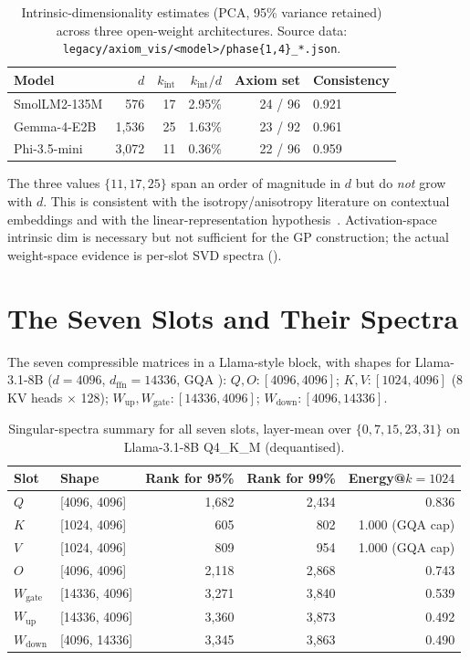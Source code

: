 \documentclass[11pt]{article}
\begin{document}
\begin{table}[h]\centering\small
\caption{Intrinsic-dimensionality estimates (PCA, 95\% variance retained)
across three open-weight architectures.  Source data:
\texttt{legacy/axiom\_vis/<model>/phase\{1,4\}\_*.json}.}
\begin{tabular}{@{}lrrrrl@{}}
\toprule
Model & $d$ & $k_\text{int}$ & $k_\text{int}/d$ & Axiom set & Consistency \\
\midrule
SmolLM2-135M  & 576   & 17 & 2.95\% & 24 / 96 & 0.921 \\
Gemma-4-E2B   & 1{,}536 & 25 & 1.63\% & 23 / 92 & 0.961 \\
Phi-3.5-mini  & 3{,}072 & 11 & 0.36\% & 22 / 96 & 0.959 \\
\bottomrule
\end{tabular}
\end{table}

The three values $\{11,17,25\}$ span an order of magnitude in $d$ but do
\emph{not} grow with $d$.  This is consistent with the
isotropy/anisotropy literature on contextual embeddings and with the
linear-representation hypothesis~\cite{elhage2022superposition}.
Activation-space intrinsic dim is necessary but not sufficient for the GP
construction; the actual weight-space evidence is per-slot SVD spectra
().

\section{The Seven Slots and Their Spectra}
\label{sec:spectra}

The seven compressible matrices in a Llama-style block, with shapes for
Llama-3.1-8B ($d{=}4096$, $d_\text{ffn}{=}14336$, GQA \cite{ainslie2023gqa}):
$Q,O\!:\![4096,4096]$;
$K,V\!:\![1024,4096]$ (8 KV heads $\times$ 128);
$W_\text{up},W_\text{gate}\!:\![14336,4096]$;
$W_\text{down}\!:\![4096,14336]$.

\begin{table}[h]\centering\small
\caption{Singular-spectra summary for all seven slots, layer-mean over
$\{0,7,15,23,31\}$ on Llama-3.1-8B Q4\_K\_M (dequantised).}
\label{tab:slots}
\begin{tabular}{@{}llrrr@{}}
\toprule
Slot & Shape & Rank for 95\% & Rank for 99\% & Energy@$k{=}1024$ \\
\midrule
$Q$               & [4096, 4096]   & 1{,}682 & 2{,}434 & 0.836 \\
$K$               & [1024, 4096]   &   605   &   802   & 1.000 (GQA cap) \\
$V$               & [1024, 4096]   &   809   &   954   & 1.000 (GQA cap) \\
$O$               & [4096, 4096]   & 2{,}118 & 2{,}868 & 0.743 \\
$W_\text{gate}$   & [14336, 4096]  & 3{,}271 & 3{,}840 & 0.539 \\
$W_\text{up}$     & [14336, 4096]  & 3{,}360 & 3{,}873 & 0.492 \\
$W_\text{down}$   & [4096, 14336]  & 3{,}345 & 3{,}863 & 0.490 \\
\bottomrule
\end{tabular}
\end{table}
\end{document}
